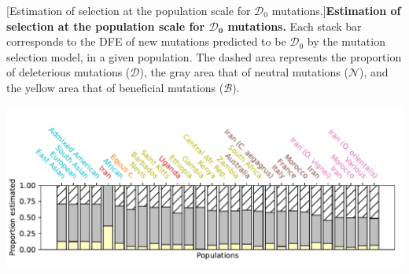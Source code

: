 \documentclass{article}
\newcommand{\SphyDel}{\mathcal{D}_0}
\newcommand{\SpopDel}{\mathcal{D}}
\newcommand{\SpopNeu}{\mathcal{N}}
\newcommand{\SpopBen}{\mathcal{B}}
\begin{document}
\begin{center}
\begin{minipage}{0.75\linewidth}
\begin{minipage}{0.09\linewidth}
            \end{minipage}
        \end{minipage}
    [Estimation of selection at the population scale for $\SphyDel$ mutations.]{\textbf{Estimation of selection at the population scale for $\bm{\SphyDel}$ mutations.} Each stack bar corresponds to the DFE of new mutations predicted to be $\SphyDel$  by the mutation selection model, in a given population. The dashed area represents the proportion of deleterious mutations ($\SpopDel$), the gray area that of neutral mutations ($\SpopNeu$), and the yellow area that of beneficial mutations ($\SpopBen$).\label{fig:pop-neg}}
    \end{center}


    \begin{center}
        \begin{minipage}{0.75\linewidth}
            \begin{minipage}{0.9\linewidth}
                \includegraphics[width=\linewidth, page=1]{artworks/Theta.weak.stacked.pdf}
            \end{minipage}
            \begin{minipage}{0.09\linewidth}

\end{minipage}
\end{minipage}
\end{center}
\end{document}
